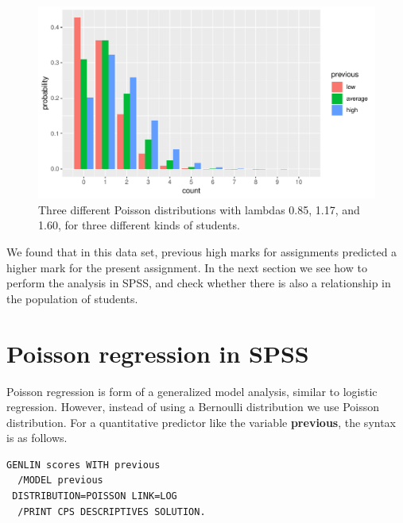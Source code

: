 \documentclass[]{book}\usepackage[]{graphicx}\usepackage[]{color}
\makeatletter
\def\maxwidth{ %
  \ifdim\Gin@nat@width>\linewidth
    \linewidth
  \else
    \Gin@nat@width
  \fi
}
\newenvironment{knitrout}{}{} %
\makeatother
\begin{document}
\begin{knitrout}
\color{fgcolor}\begin{figure}

{\centering \includegraphics[width=\maxwidth]{figure/gen_19-1} 

}

\caption[Three different Poisson distributions with lambdas 0.85, 1.17, and 1.60, for three different kinds of students]{Three different Poisson distributions with lambdas 0.85, 1.17, and 1.60, for three different kinds of students.}\label{fig:gen_19}
\end{figure}


\end{knitrout}



We found that in this data set, previous high marks for assignments predicted a higher mark for the present assignment. In the next section we see how to perform the analysis in SPSS, and check whether there is also a relationship in the population of students.

\section{Poisson regression in SPSS}

Poisson regression is form of a generalized model analysis, similar to logistic regression. However, instead of using a Bernoulli distribution we use Poisson distribution. For a quantitative predictor like the variable \textbf{previous}, the syntax is as follows.

\begin{verbatim}
GENLIN scores WITH previous
  /MODEL previous
 DISTRIBUTION=POISSON LINK=LOG
  /PRINT CPS DESCRIPTIVES SOLUTION.
\end{verbatim}
\end{document}
